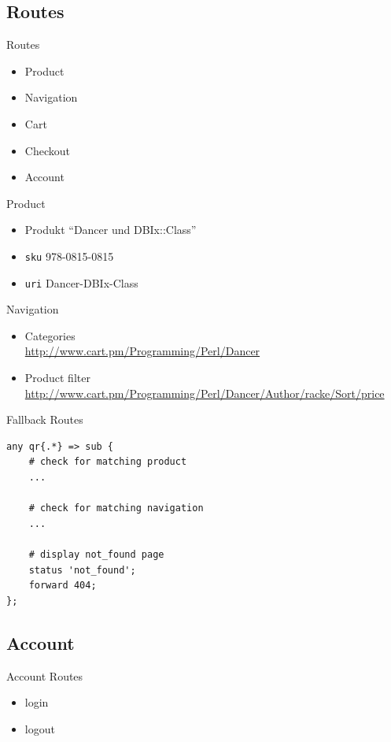 \subsection{Routes}
\begin{frame}{Routes}
\begin{itemize}
\item Product
\item Navigation
\item Cart
\item Checkout
\item Account
\end{itemize}
\end{frame}

\begin{frame}[fragile]{Product}
\begin{itemize}
\item Produkt ``Dancer und DBIx::Class''\\
\item \verb|sku| 978-0815-0815 \\
\item \verb|uri| Dancer-DBIx-Class
\end{itemize}
\end{frame}

\begin{frame}{Navigation}
\begin{itemize}
\item Categories \\
\url{http://www.cart.pm/Programming/Perl/Dancer}
\item Product filter \\
\url{http://www.cart.pm/Programming/Perl/Dancer/Author/racke/Sort/price}
\end{itemize}
\end{frame}

\begin{frame}[fragile]{Fallback Routes}
\begin{lstlisting}
any qr{.*} => sub {
    # check for matching product
    ...

    # check for matching navigation
    ...

    # display not_found page
    status 'not_found';
    forward 404;
};
\end{lstlisting}
\end{frame}

\subsection{Account}
\begin{frame}[fragile]{Account Routes}
\begin{itemize}
\item login
\item logout
\end{itemize}
\end{frame}

